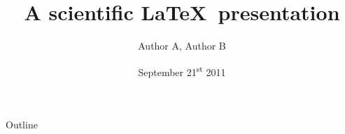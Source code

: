 \documentclass[compress]{beamer}
\title[] %
{A scientific \LaTeX~presentation}
\author[] %
{Author A, Author B}
\date[]{September 21\textsuperscript{st} 2011} %
\begin{document}
\begin{frame} %
  \titlepage
  \thispagestyle{empty}
\end{frame}

\begin{frame}{Outline} %
  \tableofcontents
\end{frame}


\end{document}
